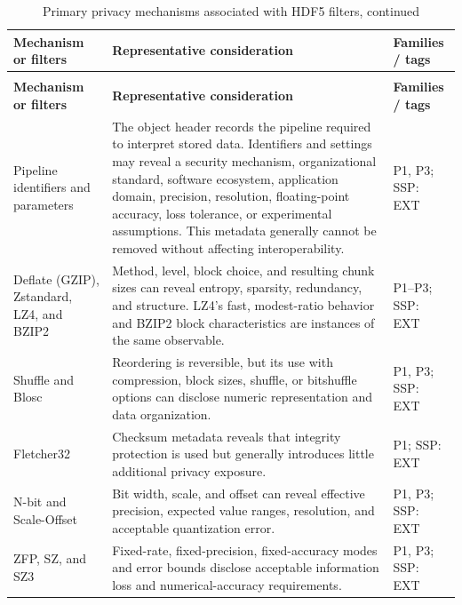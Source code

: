 \documentclass[../main.tex]{subfiles}
\begin{document}
\begingroup
\small
\setlength{\tabcolsep}{3pt}
\renewcommand{\arraystretch}{1.12}
\begin{longtable}{@{}p{}p{}p{}@{}}
\caption{Primary privacy mechanisms associated with HDF5 filters}
\label{tab:filter-plugin-privacy}\\
\hline
\textbf{Mechanism or filters} & \textbf{Representative consideration} &
\textbf{Families / tags} \\
\hline
\endfirsthead
\caption[]{Primary privacy mechanisms associated with HDF5 filters, continued}\\
\hline
\textbf{Mechanism or filters} & \textbf{Representative consideration} &
\textbf{Families / tags} \\
\hline
\endhead
\hline
\endfoot

Pipeline identifiers and parameters &
The object header records the pipeline required to interpret stored data.
Identifiers and settings may reveal a security mechanism, organizational
standard, software ecosystem, application domain, precision, resolution,
floating-point accuracy, loss tolerance, or experimental assumptions. This
metadata generally cannot be removed without affecting interoperability. &
P1, P3; SSP: EXT \\
\hline

Deflate (GZIP), Zstandard, LZ4, and BZIP2 &
Method, level, block choice, and resulting chunk sizes can reveal entropy,
sparsity, redundancy, and structure. LZ4's fast, modest-ratio behavior and
BZIP2 block characteristics are instances of the same observable. &
P1--P3; SSP: EXT \\
\hline

Shuffle and Blosc &
Reordering is reversible, but its use with compression, block sizes,
shuffle, or bitshuffle options can disclose numeric representation and data
organization. &
P1, P3; SSP: EXT \\
\hline

Fletcher32 &
Checksum metadata reveals that integrity protection is used but generally
introduces little additional privacy exposure. &
P1; SSP: EXT \\
\hline

N-bit and Scale-Offset &
Bit width, scale, and offset can reveal effective precision, expected value
ranges, resolution, and acceptable quantization error. &
P1, P3; SSP: EXT \\
\hline

ZFP, SZ, and SZ3 &
Fixed-rate, fixed-precision, fixed-accuracy modes and error bounds disclose
acceptable information loss and numerical-accuracy requirements. &
P1, P3; SSP: EXT \\
\hline


\end{longtable}
\end{document}
